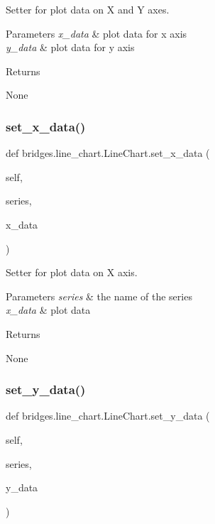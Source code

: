 Setter for plot data on X and Y axes. 


\begin{DoxyParams}{Parameters}
{\em x\+\_\+data} & plot data for x axis \\
\hline
{\em y\+\_\+data} & plot data for y axis \\
\hline
\end{DoxyParams}
\begin{DoxyReturn}{Returns}


None 
\end{DoxyReturn}
\mbox{\label{classbridges_1_1line__chart_1_1_line_chart_a74651645a41825887e8775a456176eac}} 
\subsubsection{\texorpdfstring{set\_x\_data()}{set\_x\_data()}}
{\footnotesize\ttfamily def bridges.\+line\+\_\+chart.\+Line\+Chart.\+set\+\_\+x\+\_\+data (\begin{DoxyParamCaption}\item[{}]{self,  }\item[{}]{series,  }\item[{}]{x\+\_\+data }\end{DoxyParamCaption})}



Setter for plot data on X axis. 


\begin{DoxyParams}{Parameters}
{\em series} & the name of the series \\
\hline
{\em x\+\_\+data} & plot data \\
\hline
\end{DoxyParams}
\begin{DoxyReturn}{Returns}


None 
\end{DoxyReturn}
\mbox{\label{classbridges_1_1line__chart_1_1_line_chart_ae5988ed81be128f96d63526560c61d9f}} 
\subsubsection{\texorpdfstring{set\_y\_data()}{set\_y\_data()}}
{\footnotesize\ttfamily def bridges.\+line\+\_\+chart.\+Line\+Chart.\+set\+\_\+y\+\_\+data (\begin{DoxyParamCaption}\item[{}]{self,  }\item[{}]{series,  }\item[{}]{y\+\_\+data }\end{DoxyParamCaption})}



